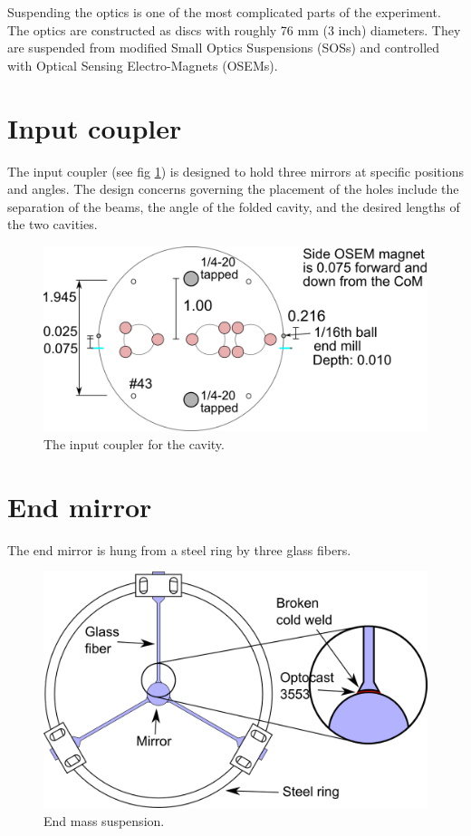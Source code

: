Suspending the optics is one of the most complicated parts of the experiment.
The optics are constructed as discs with roughly 76 mm (3 inch) diameters. 
They are suspended from modified Small Optics Suspensions (SOSs) and controlled with Optical Sensing Electro-Magnets (OSEMs).

\section{Input coupler}

The input coupler (see fig \ref{fig:inputcoupler}) is designed to hold three mirrors at specific positions and angles. 
The design concerns governing the placement of the holes include the separation of the beams, the angle of the folded cavity, and the desired lengths of the two cavities.

\begin{figure}[hp]
	\centering
		\includegraphics[width=.9\textwidth]{figures/suspensions/inputcoupler.png}
	\caption[Input coupler]{The input coupler for the cavity.}
	\label{fig:inputcoupler}
\end{figure}
 
\section{End mirror}

The end mirror is hung from a steel ring by three glass fibers.

\begin{figure}[htbp]
	\centering
		\includegraphics[width=.9\textwidth]{figures/suspensions/smallmass2.png}
	\caption[End mass suspension]{End mass suspension.}
	\label{fig:smallmassdiagram}
\end{figure}


